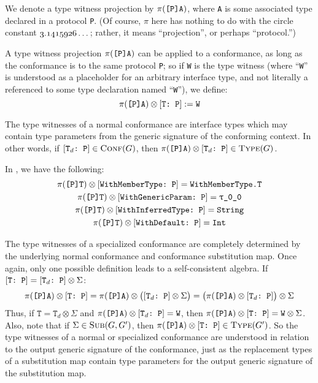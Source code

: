 \documentclass[../generics]{subfiles}
\begin{document}
We denote a type witness projection by $\pi(\texttt{[P]A})$, where \texttt{A} is some associated type declared in a protocol \texttt{P}. (Of course, $\pi$ here has nothing to do with the circle constant $\oldstylenums{3.1415926}\ldots\,$; rather, it means ``projection'', or perhaps ``protocol.'')

A type witness projection $\pi(\texttt{[P]A})$ can be applied to a conformance, as long as the conformance is to the same protocol \texttt{P}; so if \texttt{W} is the type witness (where ``\texttt{W}'' is understood as a placeholder for an arbitrary interface type, and not literally a referenced to some type declaration named ``\texttt{W}''), we define:
\[\pi(\texttt{[P]A})\otimes[\texttt{T:~P}]:=\texttt{W}\]

The type witnesses of a normal conformance are interface types which may contain type parameters from the generic signature of the conforming context. In other words, if $[\texttt{$\texttt{T}_d$:~P}]\in\textsc{Conf}({G})$, then $\pi(\texttt{[P]A})\otimes[\texttt{$\texttt{T}_d$:~P}]\in\textsc{Type}({G})$.

In , we have the following:
\begin{gather*}
\pi(\texttt{[P]T})\otimes[\texttt{WithMemberType:~P}]=\texttt{WithMemberType.T}\\
\pi(\texttt{[P]T})\otimes[\texttt{WithGenericParam:~P}]=\texttt{$\uptau$\_0\_0}\\
\pi(\texttt{[P]T})\otimes[\texttt{WithInferredType:~P}]=\texttt{String}\\
\pi(\texttt{[P]T})\otimes[\texttt{WithDefault:~P}]=\texttt{Int}
\end{gather*}

The type witnesses of a specialized conformance are completely determined by the underlying normal conformance and conformance substitution map. Once again, only one possible definition leads to a self-consistent algebra. If $[\texttt{T:~P}] = [\texttt{$\texttt{T}_d$:~P}]\otimes\Sigma$:
\[
\pi(\texttt{[P]A}) \otimes [\texttt{T:~P}] = \pi(\texttt{[P]A}) \otimes \bigl([\texttt{$\texttt{T}_d$:~P}]\otimes\Sigma\bigr) = \bigl(\pi(\texttt{[P]A}) \otimes[\texttt{$\texttt{T}_d$:~P}]\bigr)\otimes\Sigma
\]
Thus, if $\texttt{T}=\texttt{T}_d\otimes\Sigma$ and $\pi(\texttt{[P]A})\otimes[\texttt{$\texttt{T}_d$:~P}]=\texttt{W}$, then $\pi(\texttt{[P]A})\otimes[\texttt{T:~P}]=\texttt{W}\otimes\Sigma$. Also, note that if $\Sigma\in\textsc{Sub}({G, G^\prime})$, then $\pi(\texttt{[P]A}) \otimes [\texttt{T:~P}]\in\textsc{Type}({G^\prime})$. So the type witnesses of a normal or specialized conformance are understood in relation to the output generic signature of the conformance, just as the replacement types of a substitution map contain type parameters for the output generic signature of the substitution map.
\end{document}
